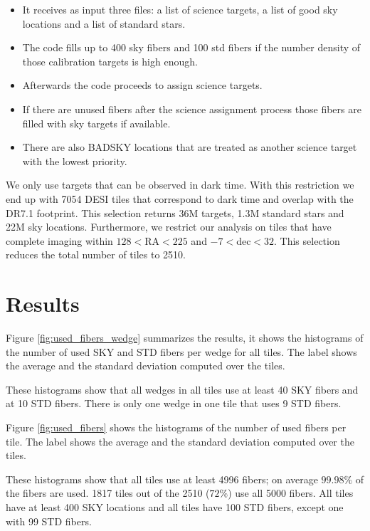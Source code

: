 \documentclass{article}
\begin{document}
\begin{itemize}
\item It receives as input three files: a list of science targets, a
  list of good sky locations and a list of standard
  stars. 
\item The code fills up to 400 sky fibers and 100 std fibers if the
  number density of those calibration targets is high enough.
\item Afterwards the code proceeds to assign science targets.
\item If there are unused fibers after the science assignment process
  those fibers are filled with sky targets if available.
\item There are also BADSKY locations that are treated as another
  science target with the lowest priority.
\end{itemize}



We only use targets that can be observed in dark time. 
With this restriction we end up with 7054 DESI tiles that correspond
to dark time and overlap with the DR7.1 footprint. 
This selection returns 36M targets, 1.3M standard stars and
22M sky locations.
Furthermore, we restrict our analysis on tiles that have complete imaging
within $128<$RA$<225$ and $-7<$dec$<32$.  This selection reduces
the total number of tiles to 2510. 

\section{Results}

Figure \ref{fig:used_fibers_wedge} summarizes the results, it shows the
histograms of the number of used SKY and STD fibers per wedge for all tiles.
The label shows the average and the standard deviation computed over
the tiles. 

These histograms show that all wedges in all tiles use at least 40 SKY
fibers and at 10 STD fibers.  
There is only one wedge in one tile that uses 9 STD fibers.

Figure \ref{fig:used_fibers}  shows the
histograms of the number of used fibers per tile.
The label shows the average and the standard deviation computed over
the tiles. 

These histograms show that all tiles use at least 4996 fibers; 
on average $99.98\%$ of the fibers are used.
1817 tiles out of the 2510 ($72\%$) use all 5000 fibers.
All tiles have at least 400 SKY locations and all tiles have 100 STD
fibers, except one with 99 STD fibers. 
\end{document}
